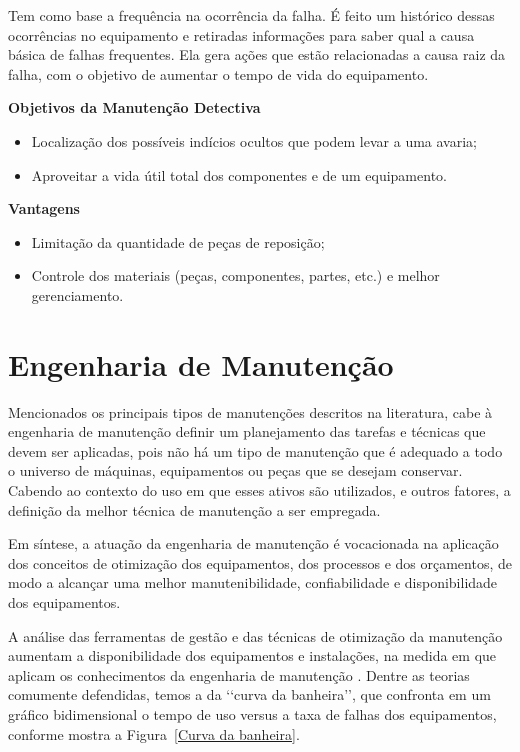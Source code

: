 		Tem como base a frequência na ocorrência da falha. É feito um histórico dessas ocorrências no equipamento e retiradas informações para saber qual a causa básica de falhas frequentes. Ela gera ações que estão relacionadas a causa raiz da falha, com o objetivo de aumentar o tempo de vida do equipamento.

		\textbf{Objetivos da Manutenção Detectiva}

			\begin{itemize}
				\item Localização dos possíveis indícios ocultos que podem levar a uma avaria; 
				\item Aproveitar a vida útil total dos componentes e de um equipamento.
			\end{itemize}

		\textbf{Vantagens}	

			\begin{itemize}
				\item Limitação da quantidade de peças de reposição; 
				\item Controle dos materiais (peças, componentes, partes, etc.) e melhor gerenciamento.
			\end{itemize}


\section{Engenharia de Manutenção}

Mencionados os principais tipos de manutenções descritos na literatura, cabe à engenharia de manutenção definir um planejamento das tarefas e técnicas que devem ser aplicadas, pois não há um tipo de manutenção que é adequado a todo o universo de máquinas, equipamentos ou peças que se desejam conservar. Cabendo ao contexto do uso em que esses ativos são utilizados, e outros fatores, a definição da melhor técnica de manutenção a ser empregada.

Em síntese, a atuação da engenharia de manutenção é vocacionada na aplicação dos conceitos de otimização dos equipamentos, dos processos e dos orçamentos, de modo a alcançar uma melhor manutenibilidade, confiabilidade e disponibilidade dos equipamentos. 

A análise das ferramentas de gestão e das técnicas de otimização da manutenção aumentam a disponibilidade dos equipamentos e instalações, na medida em que aplicam os conhecimentos da engenharia de manutenção \cite{xenos1998gerenciando}. Dentre as teorias comumente defendidas, temos a da \lq\lq curva da banheira\rq\rq, que confronta em um gráfico bidimensional o tempo de uso versus a taxa de falhas dos equipamentos, conforme mostra a Figura~\ref{Curva da banheira}.

